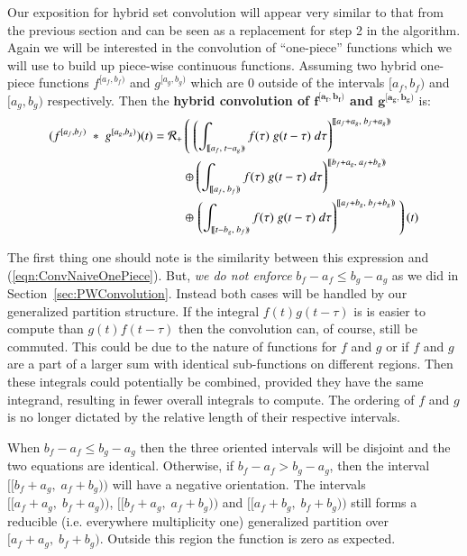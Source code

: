 Our exposition for hybrid set convolution will appear very similar to that from the previous section and can be seen as a
 replacement for step 2 in the algorithm.
Again we will be interested in the convolution of ``one-piece'' functions which we will use to build up piece-wise
continuous functions.
Assuming two hybrid one-piece functions $f^{[a_f, b_f)}$ and $g^{[a_g,b_g)}$ which are 0 outside of the intervals
 $[a_f,b_f)$ and $[a_g, b_g)$ respectively.
Then the \textbf{hybrid convolution of $\boldsymbol{f^{[a_f,b_f)}}$ and $\boldsymbol{g^{[a_g,b_g)}}$} is:
	\begin{align}
		\label{eqn:defHConvolution}
		(f^{[a_f,b_f)} \;*\; g^{[a_g,b_g)}) (t) = 
			\R[+] &\left( \; \left( 
				\int_{[\![a_f,\;t-a_g)\!)} f(\tau) \; g(t-\tau) \; d\tau \right)^{[\![a_f+a_g,\; b_f+a_g)\!)} 
					\right. \notag \\ &\oplus \left( 
				\int_{[\![a_f,\;b_f)\!)} f(\tau) \; g(t-\tau) \; d\tau \right)^{[\![b_f+a_g,\; a_f+b_g)\!)} 
					\notag \\ &\oplus \left. \left( 
				\int_{[\![t-b_g,\;b_f)\!)} f(\tau) \; g(t-\tau) \; d\tau \right)^{[\![a_f+b_g,\; b_f+b_g)\!)} 
					\; \right)(t)
	\end{align}

The first thing one should note is the similarity between this expression and (\ref{eqn:ConvNaiveOnePiece}).
But, \emph{we do not enforce} $b_f - a_f \leq b_g - a_g$ as we did in Section~\ref{sec:PWConvolution}.
Instead both cases will be handled by our generalized partition structure.
If the integral $f(t)g(t-\tau)$ is is easier to compute than $g(t)f(t-\tau)$ then the convolution can, of course, 
still be commuted.
This could be due to the nature of functions for $f$ and $g$ or if $f$ and $g$ are a part of a larger sum with identical 
sub-functions on different regions.
Then these integrals could potentially be combined, provided they have the same integrand, resulting in fewer overall 
integrals to compute.
The ordering of $f$ and $g$ is no longer dictated by the relative length of their respective intervals.


When $b_f - a_f \leq b_g - a_g$ then the three oriented intervals will be disjoint and the two equations are identical.
Otherwise, if $b_f - a_f > b_g - a_g$, then the interval $[\![b_f +a_g, \; a_f + b_g)\!)$ will have a negative orientation.
The intervals $[\![a_f+a_g, \; b_f+a_g)\!)$, $[\![b_f+a_g, \; a_f+b_g)\!)$ and $[\![a_f+b_g, \; b_f+b_g)\!)$ still forms
a reducible (i.e. everywhere multiplicity one) generalized partition over $[a_f+a_g, \; b_f+b_g)$.
Outside this region the function is zero as expected. 

